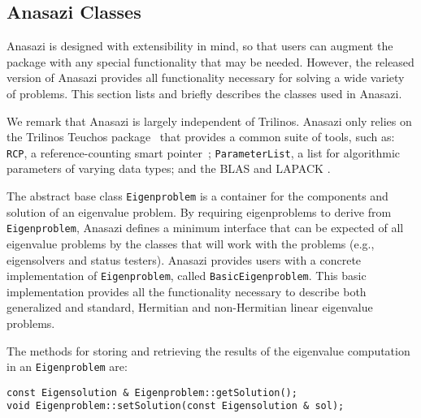 \documentclass[acmtoms]{acmtrans2m}
\newcounter{algorithm}
\newcommand{\aspace}[1]{\texttt{#1}}
\begin{document}
\subsection{Anasazi Classes}
\label{subsec:anasazi:classes}

Anasazi is designed with extensibility in mind, so that users can
augment the package with any special functionality that may be
needed. However, the released version of Anasazi provides all
functionality necessary for solving a wide variety of problems. This
section lists and briefly describes the classes used in Anasazi.


We remark that Anasazi is largely independent of Trilinos. Anasazi
only relies on the Trilinos Teuchos package~\cite{Trilinos:Teuchos}
that provides a common suite of tools, such as: \texttt{RCP},
a reference-counting smart pointer~\cite{Detlefs:1992:GCR};
\texttt{ParameterList}, a list for algorithmic parameters of
varying data types; and the BLAS
\cite{Lawson:1979:BLA,Blackford:2002:USB} and LAPACK \cite{abbd:95}.

The abstract base class \aspace{Eigenproblem} is a container for the components and
solution of an eigenvalue problem. By requiring eigenproblems to derive from
\aspace{Eigenproblem}, Anasazi defines a minimum interface that can be expected of all
eigenvalue problems by the classes that will work with the problems (e.g., eigensolvers
and status testers). Anasazi provides users with a concrete implementation of
\aspace{Eigenproblem}, called \aspace{BasicEigenproblem}. This basic implementation
provides all the functionality necessary to describe both generalized and standard,
Hermitian and non-Hermitian linear eigenvalue problems.

The methods for storing and retrieving the results of the
eigenvalue computation in an \aspace{Eigenproblem} are:
\begin{verbatim}
const Eigensolution & Eigenproblem::getSolution();
void Eigenproblem::setSolution(const Eigensolution & sol);
\end{verbatim}
\end{document}
